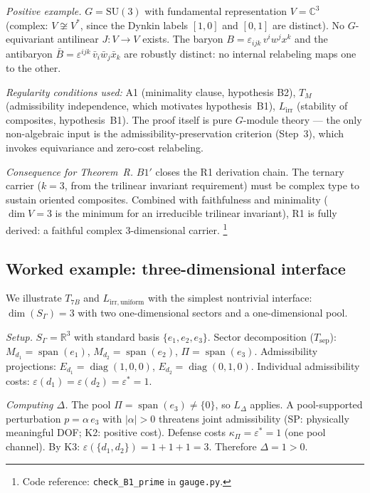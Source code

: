 \documentclass[11pt]{article}
\theoremstyle{definition}
\newcommand{\eps}{\varepsilon}
\newcommand{\SU}{\mathrm{SU}}
\DeclareMathOperator{\spn}{span}
\DeclareMathOperator{\diag}{diag}
\newcommand{\coderef}[2]{\footnote{Code reference: \texttt{#1} in \texttt{#2}.}}
\begin{document}
\smallskip\noindent\textit{Positive example.}\quad
$G = \SU(3)$ with fundamental representation $V = \mathbb{C}^3$
(complex: $V \not\cong V^*$, since the Dynkin labels $[1,0]$ and
$[0,1]$ are distinct).  No $G$-equivariant antilinear $J: V \to V$ exists.
The baryon $B = \varepsilon_{ijk}\, v^i w^j x^k$ and the antibaryon
$\bar{B} = \varepsilon^{ijk}\, \bar{v}_i \bar{w}_j \bar{x}_k$ are
robustly distinct: no internal relabeling maps one to the other.

\smallskip\noindent\textit{Regularity conditions used:}
A1 (minimality clause, hypothesis B2), $T_M$ (admissibility independence,
which motivates hypothesis~B1), $L_{\mathrm{irr}}$ (stability of composites,
hypothesis~B1).  The proof itself is pure $G$-module theory --- the only
non-algebraic input is the admissibility-preservation criterion (Step~3),
which invokes equivariance and zero-cost relabeling.

\smallskip\noindent\textit{Consequence for Theorem~R.}\quad
$B1'$ closes the R1 derivation chain.  The ternary carrier ($k = 3$, from
the trilinear invariant requirement) must be complex type to sustain
oriented composites.  Combined with faithfulness and minimality
($\dim V = 3$ is the minimum for an irreducible trilinear invariant),
R1 is fully derived: a faithful complex 3-dimensional carrier.
\coderef{check\_B1\_prime}{gauge.py}


\subsection{Worked example: three-dimensional interface}
\label{sec:worked_example}

We illustrate $T_{7B}$ and $L_{\mathrm{irr,uniform}}$ with the simplest
nontrivial interface: $\dim(S_\Gamma) = 3$ with two one-dimensional
sectors and a one-dimensional pool.

\smallskip\noindent\textit{Setup.}\quad
$S_\Gamma = \mathbb{R}^3$ with standard basis $\{e_1, e_2, e_3\}$.
Sector decomposition ($T_{\mathrm{sep}}$):
$M_{d_1} = \spn(e_1)$, $M_{d_2} = \spn(e_2)$, $\Pi = \spn(e_3)$.
Admissibility projections:
$E_{d_1} = \diag(1,0,0)$, $E_{d_2} = \diag(0,1,0)$.
Individual admissibility costs: $\eps(d_1) = \eps(d_2) = \eps^* = 1$.

\smallskip\noindent\textit{Computing $\Delta$.}\quad
The pool $\Pi = \spn(e_3) \ne \{0\}$, so $L_\Delta$ applies.
A pool-supported perturbation $p = \alpha\, e_3$ with $|\alpha| > 0$
threatens joint admissibility (SP: physically meaningful DOF;
K2: positive cost).  Defense costs $\kappa_\Pi = \eps^* = 1$ (one pool
channel).  By K3: $\eps(\{d_1, d_2\}) = 1 + 1 + 1 = 3$.
Therefore $\Delta = 1 > 0$.
\end{document}
